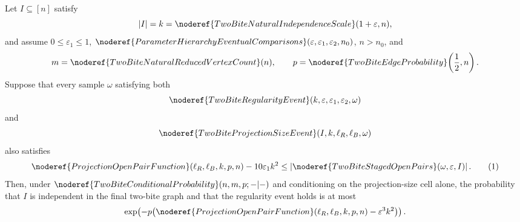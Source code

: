 \begin{lemma}
Let \(I\subseteq[n]\) satisfy
\[
|I|=k=\noderef{TwoBiteNaturalIndependenceScale}(1+\varepsilon,n),
\]
and assume \(0\le\varepsilon_1\le1\),
\(\noderef{ParameterHierarchyEventualComparisons}
(\varepsilon,\varepsilon_1,\varepsilon_2,n_0)\), \(n>n_0\), and
\[
m=\noderef{TwoBiteNaturalReducedVertexCount}(n),\qquad
p=\noderef{TwoBiteEdgeProbability}\!\left(\frac12,n\right).
\]
Suppose that every sample \(\omega\) satisfying both
\[
\noderef{TwoBiteRegularityEvent}(k,\varepsilon,\varepsilon_1,\varepsilon_2,
\omega)
\]
and
\[
\noderef{TwoBiteProjectionSizeEvent}(I,k,\ell_R,\ell_B,\omega)
\]
also satisfies
\[
\noderef{ProjectionOpenPairFunction}(\ell_R,\ell_B,k,p,n)
  -10\varepsilon_1k^2
\le
\left|\noderef{TwoBiteStagedOpenPairs}(\omega,\varepsilon,I)\right|.
\tag{1}
\]
Then, under \(\noderef{TwoBiteConditionalProbability}(n,m,p;-|-)\) and
conditioning on the projection-size cell alone, the probability that \(I\) is
independent in the final two-bite graph and that the regularity event holds is
at most
\[
\exp\!\left(
-p\bigl(\noderef{ProjectionOpenPairFunction}(\ell_R,\ell_B,k,p,n)
       -\varepsilon^3k^2\bigr)\right).
\]
\end{lemma}
